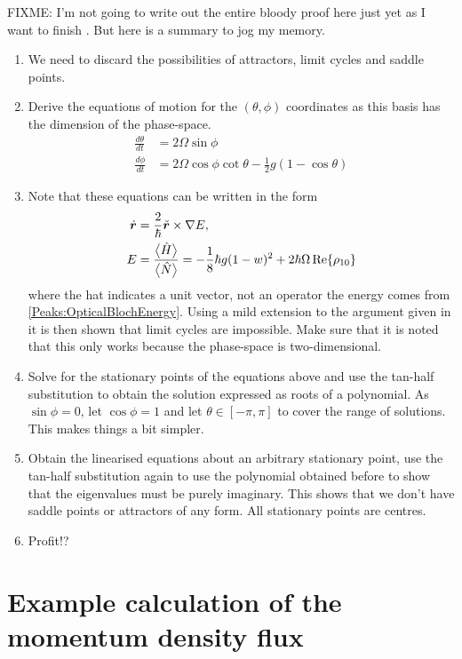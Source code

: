 FIXME: I'm not going to write out the entire bloody proof here just yet as I want to finish . But here is a summary to jog my memory.
\begin{enumerate}
    \item We need to discard the possibilities of attractors, limit cycles and saddle points.\citep{Schwartz:1963}
    \item Derive the equations of motion for the $(\theta, \phi)$ coordinates as this basis has the dimension of the phase-space.
    \begin{align}
        \frac{d \theta}{dt} &= 2 \Omega \sin\phi\\
        \frac{d \phi}{dt} &= 2 \Omega \cos\phi \cot\theta - \frac{1}{2} g (1-\cos\theta)
    \end{align}
    \item Note that these equations can be written in the form
    \begin{align}
        \dot{\bm{r}} &= \frac{2}{\hbar} \check{\bm{r}} \times \nabla E,\\
        E &= \frac{{\big<\hat{H}\big>}}{{\big<\hat{N}\big>}} = -\frac{1}{8}\hbar g(1 - w)^2 + 2 \hbar \Omega \operatorname{Re}\{\rho_{10}\}
    \end{align}
    where the hat indicates a unit vector, not an operator the energy comes from \eqref{Peaks:OpticalBlochEnergy}. Using a mild extension to the argument given in \citep[Theorem 1.14]{Ye-Yan-qian:1984} it is then shown that limit cycles are impossible. Make sure that it is noted that this only works because the phase-space is two-dimensional.
    \item Solve for the stationary points of the equations above and use the tan-half substitution to obtain the solution expressed as roots of a polynomial. As $\sin\phi=0$, let $\cos\phi=1$ and let $\theta \in [-\pi, \pi]$ to cover the range of solutions. This makes things a bit simpler.
    \item Obtain the linearised equations about an arbitrary stationary point, use the tan-half substitution again to use the polynomial obtained before to show that the eigenvalues must be purely imaginary. This shows that we don't have saddle points or attractors of any form. All stationary points are centres.
    \item Profit!?
\end{enumerate}


\section{Example calculation of the momentum density flux}
\label{MethodsAppendix:MomentumDensityFluxExampleCalculation}

